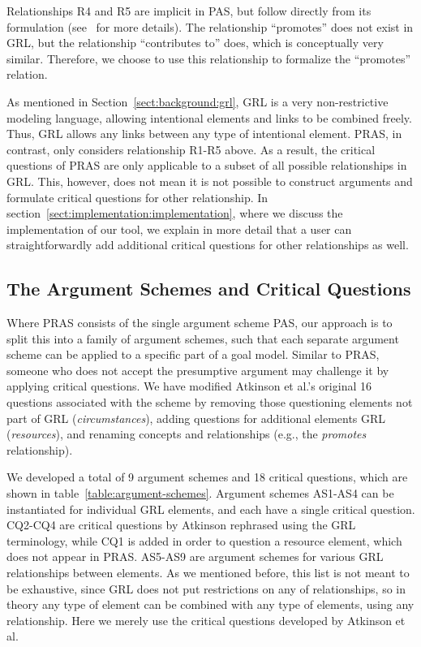 \documentclass[11.5pt,two column]{llncs}
\begin{document}
\noindent
Relationships R4 and R5 are implicit in PAS, but follow directly from its formulation (see~\cite{atkinson2007} for more details). The relationship ``promotes'' does not exist in GRL, but the relationship ``contributes to'' does, which is conceptually very similar. Therefore, we choose to use this relationship to formalize the ``promotes'' relation.

As mentioned in Section~\ref{sect:background:grl}, GRL is a very non-restrictive modeling language, allowing intentional elements and links to be combined freely. Thus, GRL allows any links between any type of intentional element. PRAS, in contrast, only considers relationship R1-R5 above. As a result, the critical questions of PRAS are only applicable to a subset of all possible relationships in GRL. This, however, does not mean it is not possible to construct arguments and formulate critical questions for other relationship.  In section~\ref{sect:implementation:implementation}, where we discuss the implementation of our tool, we explain in more detail that a user can straightforwardly add additional critical questions for other relationships as well.

\subsection{The Argument Schemes and Critical Questions}

Where PRAS consists of the single argument scheme PAS, our approach is to split this into a family of argument schemes, such that each separate argument scheme can be applied to a specific part of a goal model. Similar to PRAS, someone who does not accept the presumptive argument may challenge it by applying critical questions. We have modified Atkinson et al.'s original 16 questions associated with the scheme \cite{atkinson2006argumentation} by removing those questioning elements not part of GRL (\emph{circumstances}), adding questions for additional elements GRL (\emph{resources}), and renaming concepts and relationships (e.g., the \emph{promotes} relationship).

We developed a total of 9 argument schemes and 18 critical questions, which are shown in table~\ref{table:argument-schemes}. Argument schemes AS1-AS4 can be instantiated for individual GRL elements, and each have a single critical question. CQ2-CQ4 are critical questions by Atkinson rephrased using the GRL terminology, while CQ1 is added in order to question a resource element, which does not appear in PRAS. AS5-AS9 are argument schemes for various GRL relationships between elements. As we mentioned before, this list is not meant to be exhaustive, since GRL does not put restrictions on any of relationships, so in theory any type of element can be combined with any type of elements, using any relationship. Here we merely use the critical questions developed by Atkinson et al.
 
\end{document}
